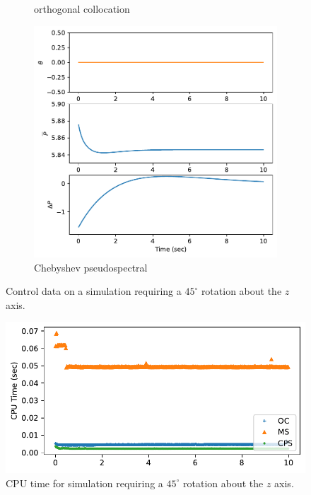 \documentclass[]{article}
\begin{document}
\begin{figure}[H]
\begin{subfigure}[b]{0.3\textwidth}
		\caption{orthogonal collocation}
	\end{subfigure}%
	\begin{subfigure}[b]{0.3\textwidth}
		\centering
		\includegraphics[width=\textwidth]{figures/control45dz5.pdf}
		\caption{Chebyshev pseudospectral}
	\end{subfigure}
	\caption{Control data on a simulation requiring a $45^{\circ}$ rotation about the $z$ axis.}
	\label{fig:control45z}
\end{figure}


\begin{figure}[H]
	\centering
	\includegraphics[width=\textwidth]{figures/time45dz.pdf}
	\caption{CPU time for simulation requiring a $45^{\circ}$ rotation about the $z$ axis.}
	\label{fig:time45z}
\end{figure}
\end{document}
